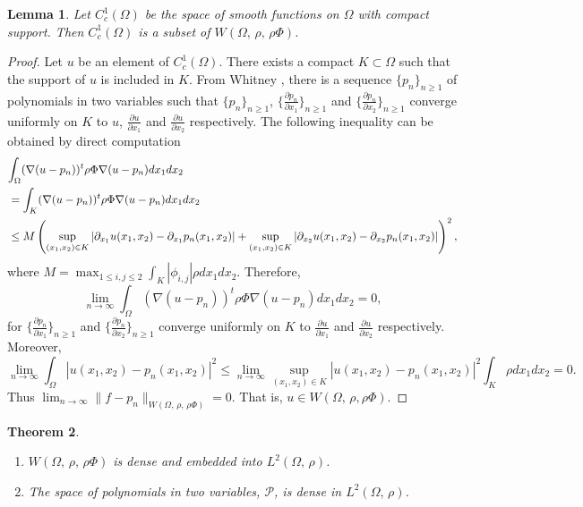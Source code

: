 \documentclass[11pt]{article}
\newtheorem{theorem}{Theorem}
\newtheorem{lemma}[theorem]{Lemma}
\begin{document}
	
	
	\begin{lemma}\label{Lemma1}Let $C^1_c(\Omega)$ be the space of smooth functions on $\Omega$ with compact support. Then $C^1_c(\Omega)$ is a subset of $W(\Omega,\,\rho,\,\rho\Phi)$.	
	\end{lemma}
	\begin{proof}
		Let $u$ be an element of $C_c^1(\Omega)$. There exists a compact $K\subset\Omega$ such that the support of $u$ is included in $K$. From Whitney \cite{WH}, there is a sequence {$\{p_n\}_{n \geq 1}$}  of polynomials in two variables such that {$\{p_n\}_{n \geq 1}$}, {$\{\frac{\partial p_n}{\partial{x_1}}\}_{n \geq 1}$}  and {$\{\frac{\partial p_n}{\partial{x_2}}\}_{n \geq 1}$}  converge uniformly on $K$ to $u$, $\frac{\partial u}{\partial{x_1}}$ and $\frac{\partial u}{\partial{x_2}}$ respectively. The following inequality can be obtained by direct computation 
		\begin{align*}
			&\lefteqn{\int_{\Omega}(\nabla (u-p_n))^t\rho\Phi\nabla (u-p_n)dx_1dx_2}\\
			&=\int_K(\nabla (u-p_n))^t\rho\Phi\nabla (u-p_n)dx_1dx_2\\
			&\leq M  \left(\sup_{(x_1,x_2)\in K}|\partial_{x_1}u(x_1,x_2)-\partial_{x_1}p_n(x_1,x_2)|+\sup_{(x_1,x_2)\in K}|\partial_{x_2}u(x_1,x_2)-\partial_{x_2}p_n(x_1,x_2)|\right)^2,
		\end{align*}
		where $M=\displaystyle{\max_{1\leq i,j\leq 2}\int_K|\phi_{i,j}|\rho dx_1dx_2}$.  Therefore, $$\displaystyle{\lim_{n\to \infty}\int_{\Omega}(\nabla (u-p_n))^t\rho\Phi\nabla (u-p_n)dx_1dx_2=0},$$ for $\{\frac{\partial p_n}{\partial{x_1}}\}_{n \geq 1}$  and $\{\frac{\partial p_n}{\partial{x_2}}\}_{n \geq 1}$  converge uniformly on $K$ to $\frac{\partial u}{\partial{x_1}}$ and $\frac{\partial u}{\partial{x_2}}$ respectively. Moreover,    $$\lim_{n \to \infty}\int_{\Omega}|u(x_1,x_2)-p_n(x_1,x_2)|^2\leq \lim_{n \to \infty}\sup_{(x_1,x_2)\in K}|u(x_1,x_2)-p_n(x_1,x_2)|^2\int_K\rho dx_1dx_2=0.$$ 
		Thus $\displaystyle{\lim_{n\to \infty} \|f-p_n\|_{W(\Omega,\, \rho,\,\rho\Phi)}}=0$. That is, $u\in W(\Omega,\, \rho,\rho\Phi)$. 
	\end{proof}
	\begin{theorem} \hspace{ 1 cm}\\
		\begin{enumerate}
			\item $W(\Omega,\,\rho,\,\rho\Phi)$ is dense and embedded into $L^2\left(\Omega,\,\rho\right)$.
			\item  The space of polynomials in two variables, $\mathcal{P}$, is dense in $L^2(\Omega,\,\rho)$.
		\end{enumerate}
		
	\end{theorem}
\end{document}
